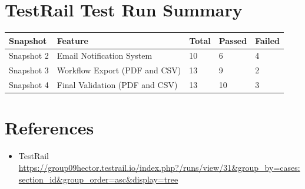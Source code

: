 \documentclass[12pt]{article}
\begin{document}
\section{TestRail Test Run Summary}
 
\begin{center}
\begin{tabular}{lllll}
\toprule
Snapshot & Feature & Total & Passed & Failed \\
\midrule
Snapshot 2 & Email Notification System      & 10 & 6  & 4 \\
Snapshot 3 & Workflow Export (PDF and CSV)  & 13 & 9  & 2 \\
Snapshot 4 & Final Validation (PDF and CSV) & 13 & 10 & 3 \\
\bottomrule
\end{tabular}
\end{center}
\section{References}
\begin{itemize}
    \item TestRail \\
    \url{https://group09hector.testrail.io/index.php?/runs/view/31&group_by=cases:section_id&group_order=asc&display=tree}
\end{itemize}
 
\end{document}
